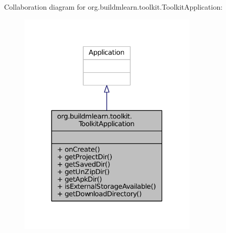 Collaboration diagram for org.\-buildmlearn.\-toolkit.\-Toolkit\-Application\-:
\nopagebreak
\begin{figure}[H]
\begin{center}
\leavevmode
\includegraphics[width=242pt]{de/d2d/classorg_1_1buildmlearn_1_1toolkit_1_1ToolkitApplication__coll__graph}
\end{center}
\end{figure}
